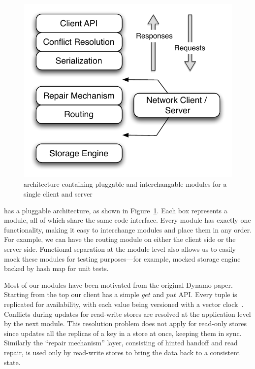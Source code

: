 \begin{figure}
  \centering
    \includegraphics[scale=0.55]{images/arch.pdf}
  \caption{\projectname{} architecture containing pluggable and interchangable modules for a single client and server}
  \label{arch}
\end{figure}

\projectname{} has a pluggable architecture, as shown in
Figure~\ref{arch}. Each box represents a module, all of which share
the same code interface. Every module has exactly one functionality,
making it easy to interchange modules and place them in any order. For
example, we can have the routing module on either the client side or
the server side. Functional separation at the module level also allows
us to easily mock these modules for testing purposes---for example,
mocked storage engine backed by hash map for unit tests. 

Most of our modules have been motivated from the original Dynamo
paper. Starting from the top our client has a simple $get$ and $put$
API. Every tuple is replicated for availability, with each value being
versioned with a vector clock~\cite{lamport}. Conflicts during updates
for read-write stores are resolved at the application level by the
next module. This resolution problem does not apply for read-only
stores since \projectname{} updates all the replicas of a key in a
store at once, keeping them in sync. Similarly the ``repair
mechanism'' layer, consisting of hinted handoff and read repair, is
used only by read-write stores to bring the data back to a consistent
state. 

